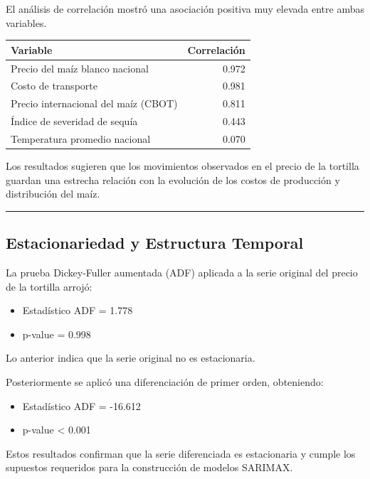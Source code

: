 \documentclass[11pt]{article}
\providecommand{\tightlist}{%
      \setlength{\itemsep}{0pt}\setlength{\parskip}{0pt}}
\begin{document}
El análisis de correlación mostró una asociación positiva muy elevada
entre ambas variables.

\begin{longtable}[]{@{}lr@{}}
\toprule\noalign{}
Variable & Correlación \\
\midrule\noalign{}
\endhead
\bottomrule\noalign{}
\endlastfoot
Precio del maíz blanco nacional & 0.972 \\
Costo de transporte & 0.981 \\
Precio internacional del maíz (CBOT) & 0.811 \\
Índice de severidad de sequía & 0.443 \\
Temperatura promedio nacional & 0.070 \\
\end{longtable}

Los resultados sugieren que los movimientos observados en el precio de
la tortilla guardan una estrecha relación con la evolución de los costos
de producción y distribución del maíz.

\begin{center}\rule{0.5\linewidth}{0.5pt}\end{center}

\hypertarget{estacionariedad-y-estructura-temporal}{%
\subsection{Estacionariedad y Estructura
Temporal}\label{estacionariedad-y-estructura-temporal}}

La prueba Dickey-Fuller aumentada (ADF) aplicada a la serie original del
precio de la tortilla arrojó:

\begin{itemize}
\tightlist
\item
  Estadístico ADF = 1.778
\item
  p-value = 0.998
\end{itemize}

Lo anterior indica que la serie original no es estacionaria.

Posteriormente se aplicó una diferenciación de primer orden, obteniendo:

\begin{itemize}
\tightlist
\item
  Estadístico ADF = -16.612
\item
  p-value \textless{} 0.001
\end{itemize}

Estos resultados confirman que la serie diferenciada es estacionaria y
cumple los supuestos requeridos para la construcción de modelos SARIMAX.
\end{document}
